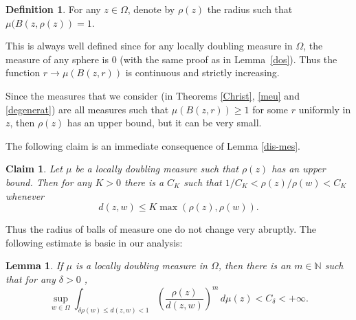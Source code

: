 \documentclass[12pt,twoside,final,psamsfonts]{amsart}
\theoremstyle{plain}
\newtheorem{lema}{Lemma}
\newtheorem{claim}{Claim}
\theoremstyle{remark}
\theoremstyle{definition}
\newtheorem*{defi}{Definition}
\newcommand{\N}{{\mathbb N}}
\begin{document}
\begin{defi}
For any $z\in\Omega$, denote by $\rho(z)$ the radius such that
$\mu(B(z,\rho(z))=1$. 
\end{defi}

This is always well defined since for any locally  doubling measure in
$\Omega$, the measure of any sphere is $0$ (with the same proof as in
Lemma~\ref{dos}). Thus the function $r\to
\mu(B(z,r))$ is continuous and strictly increasing. 

Since the measures that we consider (in Theorems \ref{Christ}, \ref{meu} and
\ref{degenerat}) are all measures such that
$\mu(B(z,r))\ge 1$ for some $r$ uniformly in $z$, then $\rho(z)$ has an upper
bound, but it can be very small.

The following claim 
is an immediate consequence of Lemma
\ref{dis-mes}.
\begin{claim}\label{propietats-mesura} 
Let $\mu$ be a locally doubling measure such that $\rho(z)$ 
has an upper bound. Then for any $K>0$ there is a $C_K$ such that 
$1/C_K<\rho(z)/\rho(w)<C_K$
whenever 
\[d(z,w)\le K \max(\rho(z),\rho(w)).\]
\end{claim}
Thus the radius of balls of measure one do not
change very abruptly. 
The following estimate is basic in our analysis:

\begin{lema}\label{clau}
If $\mu$ is a locally doubling measure in $\Omega$, then 
there is an $m\in\N$ such that for any  $\delta>0$ ,
\[
\sup_{w\in \Omega} \int_{\delta\rho(w)\le d(z,w)<1}
\left(\frac{\rho(z)}{d(z,w)}\right)^m \,d\mu(z)<C_\delta< +\infty.
\]
\end{lema}
\end{document}
